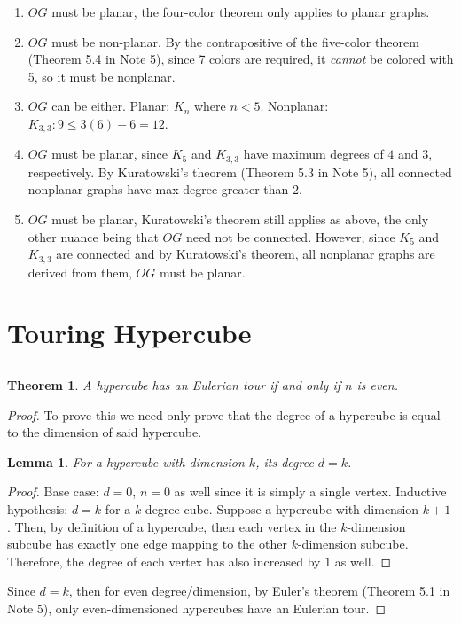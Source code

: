 \documentclass{article}
\newtheorem{theorem}{Theorem}
\newtheorem{lemma}{Lemma}
\begin{document}
\begin{enumerate}
    \item \(OG\) must be planar, the four-color theorem only applies to planar graphs.
    \item \(OG\) must be non-planar.
    By the contrapositive of the five-color theorem (Theorem 5.4 in Note 5), since 7 colors are required, it \emph{cannot} be colored with 5, so it must be nonplanar.
    \item \(OG\) can be either.
    Planar: \(K_n\) where \(n < 5\).
    Nonplanar: \(K_{3, 3}: 9 \leqslant 3(6) - 6 = 12\).
    \item \(OG\) must be planar, since \(K_5\) and \(K_{3, 3}\) have maximum degrees of \(4\) and \(3\), respectively.
    By Kuratowski's theorem (Theorem 5.3 in Note 5), all connected nonplanar graphs have max degree greater than \(2\).
    \item \(OG\) must be planar, Kuratowski's theorem still applies as above, the only other nuance being that \(OG\) need not be connected.
    However, since \(K_5\) and \(K_{3, 3}\) are connected and by Kuratowski's theorem, all nonplanar graphs are derived from them, \(OG\) must be planar.
\end{enumerate}

\section{Touring Hypercube}

\subsection{}

\begin{theorem}
    A hypercube has an Eulerian tour if and only if \(n\) is even.
\end{theorem}
\begin{proof}
    To prove this we need only prove that the degree of a hypercube is equal to the dimension of said hypercube.
    \begin{lemma}
        For a hypercube with dimension \(k\), its degree \(d = k\).
    \end{lemma}
    \begin{proof}
        Base case: \(d = 0\), \(n = 0\) as well since it is simply a single vertex.
        Inductive hypothesis: \(d = k\) for a \(k\)-degree cube.
        Suppose a hypercube with dimension \(k + 1\).
        Then, by definition of a hypercube, then each vertex in the \(k\)-dimension subcube has exactly one edge mapping to the other \(k\)-dimension subcube.
        Therefore, the degree of each vertex has also increased by \(1\) as well.
    \end{proof}
    Since \(d = k\), then for even degree/dimension, by Euler's theorem (Theorem 5.1 in Note 5), only even-dimensioned hypercubes have an Eulerian tour.
\end{proof}
\end{document}
